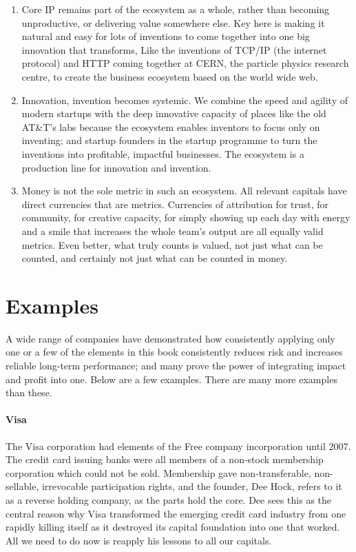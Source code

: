 \begin{enumerate}
\item Core IP remains part of the ecosystem as a whole, rather than becoming unproductive, or delivering value somewhere else. Key here is making it natural and easy for lots of inventions to come together into one big innovation that transforms,  Like the inventions of TCP/IP (the internet protocol) and HTTP coming together at CERN, the particle physics research centre, to create the business ecosystem based on the world wide web. 


\item Innovation, invention becomes systemic. We combine the speed and agility of modern startups with the deep innovative capacity of places like the old AT\&T’s labs because the ecosystem enables inventors to focus only on inventing; and startup founders in the startup programme to turn the inventions into profitable, impactful businesses.  The ecosystem is a production line for innovation and invention.


\item Money is not the sole metric in such an ecosystem. All relevant capitals have direct currencies that are metrics. Currencies  of attribution for trust, for community, for creative capacity, for simply showing up each day with energy and a smile that increases the whole team’s output are all equally valid metrics. Even better, what truly counts is valued, not just what can be counted, and certainly not just what can be counted in money.
\end{enumerate}




\section{Examples}
\label{section:financing-examples}


A wide range of companies have demonstrated how consistently applying only one or a few of the elements in this book consistently reduces risk and increases reliable long-term performance; and many prove the power of integrating impact and profit into one. Below are a few examples. There are many more examples than these.


\paragraph{Visa} The Visa  corporation had elements of the Free company incorporation until 2007. The credit card issuing banks were all members of a non-stock membership corporation which could not be sold. Membership gave non-transferable, non-sellable, irrevocable participation rights, and the founder, Dee Hock,  refers to it as a reverse holding company, as the parts hold the core. Dee sees this as the central reason why Visa transformed the emerging credit card industry from one rapidly killing itself as it destroyed its capital foundation into one that worked. All we need to do now is reapply his lessons to all our capitals. 


